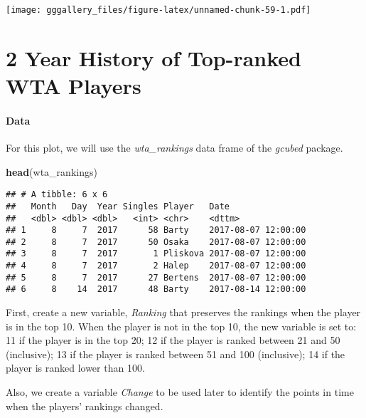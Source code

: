 \documentclass[]{book}
\newenvironment{Shaded}{\begin{snugshade}}{\end{snugshade}}
\newcommand{\KeywordTok}[1]{\textcolor[rgb]{0.13,0.29,0.53}{\textbf{#1}}}
\newcommand{\NormalTok}[1]{#1}
\begin{document}
\texttt{[image: gggallery\_files/figure-latex/unnamed-chunk-59-1.pdf]}

\hypertarget{wta}{%
\chapter*{2 Year History of Top-ranked WTA Players}\label{wta}}

\hypertarget{wtadata}{%
\subsubsection*{Data}\label{wtadata}}

For this plot, we will use the \emph{wta\_rankings} data frame of the \emph{gcubed} package.

\begin{Shaded}
\begin{Highlighting}[]
\KeywordTok{head}\NormalTok{(wta_rankings)}
\end{Highlighting}
\end{Shaded}

\begin{verbatim}
## # A tibble: 6 x 6
##   Month   Day  Year Singles Player   Date               
##   <dbl> <dbl> <dbl>   <int> <chr>    <dttm>             
## 1     8     7  2017      58 Barty    2017-08-07 12:00:00
## 2     8     7  2017      50 Osaka    2017-08-07 12:00:00
## 3     8     7  2017       1 Pliskova 2017-08-07 12:00:00
## 4     8     7  2017       2 Halep    2017-08-07 12:00:00
## 5     8     7  2017      27 Bertens  2017-08-07 12:00:00
## 6     8    14  2017      48 Barty    2017-08-14 12:00:00
\end{verbatim}

First, create a new variable, \emph{Ranking} that preserves the rankings when the player is in the top 10. When the player is not in the top 10, the new variable is set to: 11 if the player is in the top 20; 12 if the player is ranked between 21 and 50 (inclusive); 13 if the player is ranked between 51 and 100 (inclusive); 14 if the player is ranked lower than 100.

Also, we create a variable \emph{Change} to be used later to identify the points in time when the players' rankings changed.
\end{document}
